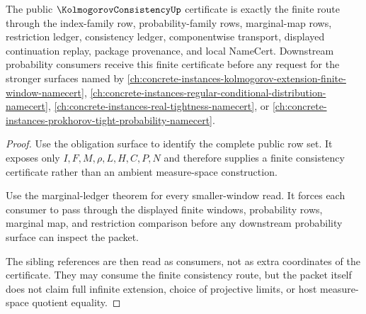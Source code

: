 \begin{theorem}
\label{thm:kolmogorov-consistency-public-certificate}
The public $\KolmogorovConsistencyUp$ certificate is exactly the finite route
through the index-family row, probability-family rows, marginal-map rows,
restriction ledger, consistency ledger, componentwise transport, displayed
continuation replay, package provenance, and local NameCert. Downstream
probability consumers receive this finite certificate before any request for
the stronger surfaces named by
\autoref{ch:concrete-instances-kolmogorov-extension-finite-window-namecert},
\autoref{ch:concrete-instances-regular-conditional-distribution-namecert},
\autoref{ch:concrete-instances-real-tightness-namecert}, or
\autoref{ch:concrete-instances-prokhorov-tight-probability-namecert}.
\end{theorem}
\begin{proof}
Use the obligation surface to identify the complete public row set. It exposes
only $I,F,M,\rho,L,H,C,P,N$ and therefore supplies a finite consistency
certificate rather than an ambient measure-space construction.

Use the marginal-ledger theorem for every smaller-window read. It forces each
consumer to pass through the displayed finite windows, probability rows,
marginal map, and restriction comparison before any downstream probability
surface can inspect the packet.

The sibling references are then read as consumers, not as extra coordinates of
the certificate. They may consume the finite consistency route, but the packet
itself does not claim full infinite extension, choice of projective limits, or
host measure-space quotient equality.
\end{proof}


\begin{closurestatus}{\KolmogorovConsistencyUp}
  \theoryclosure{\seedClosure}
  \formalstatus{\unformalizedV}
\end{closurestatus}
